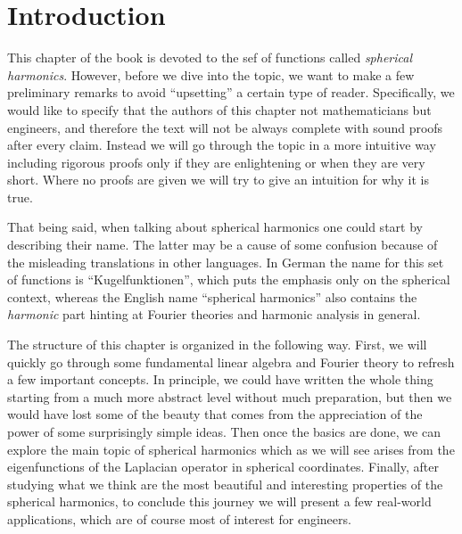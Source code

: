 
\section{Introduction}

This chapter of the book is devoted to the sef of functions called
\emph{spherical harmonics}. However, before we dive into the topic, we want to
make a few preliminary remarks to avoid ``upsetting'' a certain type of
reader. Specifically, we would like to specify that the authors of this
chapter not mathematicians but engineers, and therefore the text will not be
always complete with sound proofs after every claim. Instead we will go
through the topic in a more intuitive way including rigorous proofs only if
they are enlightening or when they are very short. Where no proofs are given
we will try to give an intuition for why it is true.

That being said, when talking about spherical harmonics one could start by
describing their name. The latter may be a cause of some confusion because of
the misleading translations in other languages. In German the name for this
set of functions is ``Kugelfunktionen'', which puts the emphasis only on the
spherical context, whereas the English name ``spherical harmonics'' also
contains the \emph{harmonic} part hinting at Fourier theories and harmonic
analysis in general.

The structure of this chapter is organized in the following way. First, we
will quickly go through some fundamental linear algebra and Fourier theory to
refresh a few important concepts. In principle, we could have written the
whole thing starting from a much more abstract level without much preparation,
but then we would have lost some of the beauty that comes from the
appreciation of the power of some surprisingly simple ideas. Then once the
basics are done, we can explore the main topic of spherical harmonics which as
we will see arises from the eigenfunctions of the Laplacian operator in
spherical coordinates. Finally, after studying what we think are the most
beautiful and interesting properties of the spherical harmonics, to conclude
this journey we will present a few real-world applications, which are of
course most of interest for engineers.

